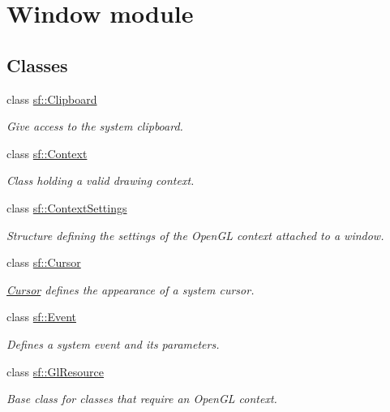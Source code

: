 \hypertarget{group__window}{}\section{Window module}
\label{group__window}
\subsection*{Classes}
\begin{DoxyCompactItemize}
\item 
class \mbox{\hyperlink{classsf_1_1_clipboard}{sf\+::\+Clipboard}}
\begin{DoxyCompactList}\small\item\em Give access to the system clipboard. \end{DoxyCompactList}\item 
class \mbox{\hyperlink{classsf_1_1_context}{sf\+::\+Context}}
\begin{DoxyCompactList}\small\item\em Class holding a valid drawing context. \end{DoxyCompactList}\item 
class \mbox{\hyperlink{structsf_1_1_context_settings}{sf\+::\+Context\+Settings}}
\begin{DoxyCompactList}\small\item\em Structure defining the settings of the Open\+GL context attached to a window. \end{DoxyCompactList}\item 
class \mbox{\hyperlink{classsf_1_1_cursor}{sf\+::\+Cursor}}
\begin{DoxyCompactList}\small\item\em \mbox{\hyperlink{classsf_1_1_cursor}{Cursor}} defines the appearance of a system cursor. \end{DoxyCompactList}\item 
class \mbox{\hyperlink{classsf_1_1_event}{sf\+::\+Event}}
\begin{DoxyCompactList}\small\item\em Defines a system event and its parameters. \end{DoxyCompactList}\item 
class \mbox{\hyperlink{classsf_1_1_gl_resource}{sf\+::\+Gl\+Resource}}
\begin{DoxyCompactList}\small\item\em Base class for classes that require an Open\+GL context. \end{DoxyCompactList}\item 

\end{DoxyCompactItemize}

